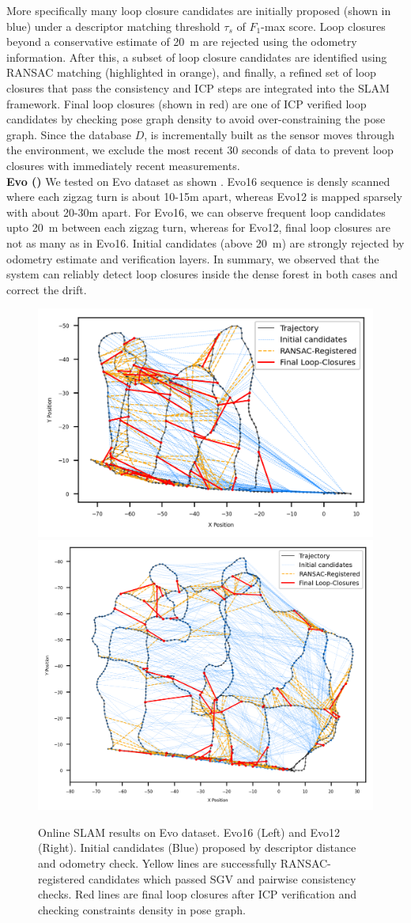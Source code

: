More specifically many loop closure candidates are initially proposed (shown in blue) under a descriptor matching threshold $\tau_{s}$ of $F_1$-max score. Loop closures beyond a conservative estimate of \SI{20}{\meter} are rejected using the odometry information. After this, a subset of loop closure candidates are identified using RANSAC matching (highlighted in orange), and finally, a refined set of loop closures that pass the consistency and ICP steps are integrated into the SLAM framework. Final loop closures (shown in red) are one of ICP verified loop candidates by checking pose graph density to avoid over-constraining the pose graph. Since the database $D$, is incrementally built as the sensor moves through the environment, we exclude the most recent 30 seconds of data to prevent loop closures with immediately recent measurements.\\
\newline
\textbf{Evo (\textbf{})}\hspace{0.5em} We tested on Evo dataset as shown . Evo16 sequence is densly scanned where each zigzag turn is about 10-15m apart, whereas Evo12 is mapped sparsely with about 20-30m apart. For Evo16, we can observe frequent loop candidates upto \SI{20}{\meter} between each zigzag turn, whereas for Evo12, final loop closures are not as many as in Evo16. Initial candidates (above \SI{20}{\meter}) are strongly rejected by odometry estimate and verification layers. In summary, we observed that the system can reliably detect loop closures inside the dense forest in both cases and correct the drift. \\
\begin{figure}[htbp]
  \centering
  \includegraphics[width=0.53\columnwidth]{pics/exp_2_1_evo16_online2.png}
  \includegraphics[width=0.46\columnwidth]{pics/exp_2_1_evo12_online.png}
  \caption{Online SLAM results on Evo dataset. Evo16 (Left) and Evo12 (Right). Initial candidates (Blue) proposed by descriptor distance and odometry check. Yellow lines are successfully RANSAC-registered candidates which passed SGV and pairwise consistency checks. Red lines are final loop closures after ICP verification and checking constraints density in pose graph.}
  \label{fig:exp_2_1_evo_online}
\end{figure}
